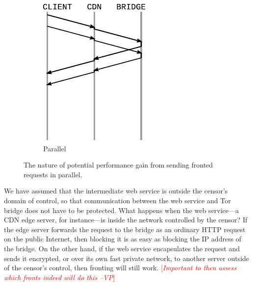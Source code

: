 \documentclass{sig-alternate}
\newcommand{\note}[1]{{\textcolor{red}{[\textit{#1}]}}}
\newcommand{\vp}[1]{\note{#1 --VP}}
\begin{document}
\begin{figure}
\begin{subfigure}[t]{0.40\linewidth}
\includegraphics[width=\linewidth]{wire-parallel}
\caption{Parallel}
\label{fig:wire-parallel}
\end{subfigure}

\caption{
The nature of potential performance gain
from sending fronted requests in parallel.
}
\label{fig:wire}
\end{figure}

We have assumed that the intermediate web service is
outside the censor's domain of control,
so that communication between the web service and Tor bridge
does not have to be protected.
What happens when the web service---a CDN edge server, for instance---is
inside the network controlled by the censor?
If the edge server forwards the request to the bridge
as an ordinary HTTP request on the public Internet,
then blocking it is as easy as blocking the IP address of the bridge.
On the other hand, if the web service encapsulates
the request and sends it encrypted, or over its own fast private network,
to another server outside of the censor's control,
then fronting will still work.
\vp{Important to then assess which fronts indeed will do this}
\end{document}
